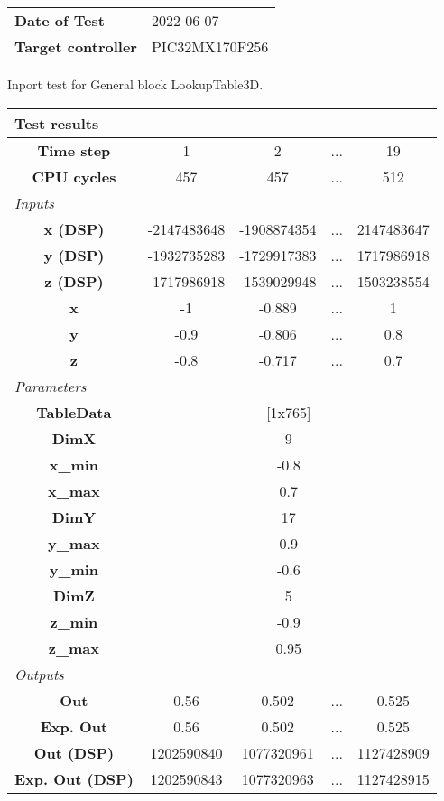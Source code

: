 \begin{tabular}{l l}
\textbf{Date of Test} & 2022-06-07 \tabularnewline
\textbf{Target controller} & PIC32MX170F256 \tabularnewline
\end{tabular}
\vspace{1ex}
Inport test for General block LookupTable3D.

\vspace{1em}
\begin{tabularx}{\textwidth}{|c|c|c|>{\centering\arraybackslash}X|c|}
\hline
\multicolumn{5}{|l|}{\cellcolor[gray]{0.8}\textbf{Test results}} \tabularnewline \hline
\textbf{Time step} & 1 & 2 & ... & 19 \tabularnewline \hline
\textbf{CPU cycles} & 457 & 457 & ... & 512 \tabularnewline \hline
\multicolumn{5}{|l|}{\cellcolor[gray]{0.9}\textit{Inputs}} \tabularnewline \hline
\textbf{x (DSP)} & -2147483648 & -1908874354 & ... & 2147483647 \tabularnewline \hline
\textbf{y (DSP)} & -1932735283 & -1729917383 & ... & 1717986918 \tabularnewline \hline
\textbf{z (DSP)} & -1717986918 & -1539029948 & ... & 1503238554 \tabularnewline \hline
\textbf{x} & -1 & -0.889 & ... & 1 \tabularnewline \hline
\textbf{y} & -0.9 & -0.806 & ... & 0.8 \tabularnewline \hline
\textbf{z} & -0.8 & -0.717 & ... & 0.7 \tabularnewline \hline
\multicolumn{5}{|l|}{\cellcolor[gray]{0.9}\textit{Parameters}} \tabularnewline \hline
\textbf{TableData} & \multicolumn{4}{c|}{[1x765]} \tabularnewline \hline
\textbf{DimX} & \multicolumn{4}{c|}{9} \tabularnewline \hline
\textbf{x\_min} & \multicolumn{4}{c|}{-0.8} \tabularnewline \hline
\textbf{x\_max} & \multicolumn{4}{c|}{0.7} \tabularnewline \hline
\textbf{DimY} & \multicolumn{4}{c|}{17} \tabularnewline \hline
\textbf{y\_max} & \multicolumn{4}{c|}{0.9} \tabularnewline \hline
\textbf{y\_min} & \multicolumn{4}{c|}{-0.6} \tabularnewline \hline
\textbf{DimZ} & \multicolumn{4}{c|}{5} \tabularnewline \hline
\textbf{z\_min} & \multicolumn{4}{c|}{-0.9} \tabularnewline \hline
\textbf{z\_max} & \multicolumn{4}{c|}{0.95} \tabularnewline \hline
\multicolumn{5}{|l|}{\cellcolor[gray]{0.9}\textit{Outputs}} \tabularnewline \hline
\textbf{Out} & 0.56 & 0.502 & ... & 0.525 \tabularnewline \hline
\textbf{Exp. Out} & 0.56 & 0.502 & ... & 0.525 \tabularnewline \hline
\textbf{Out (DSP)} & 1202590840 & 1077320961 & ... & 1127428909 \tabularnewline \hline
\textbf{Exp. Out (DSP)} & 1202590843 & 1077320963 & ... & 1127428915 \tabularnewline \hline
\end{tabularx}
\vspace{1ex}

